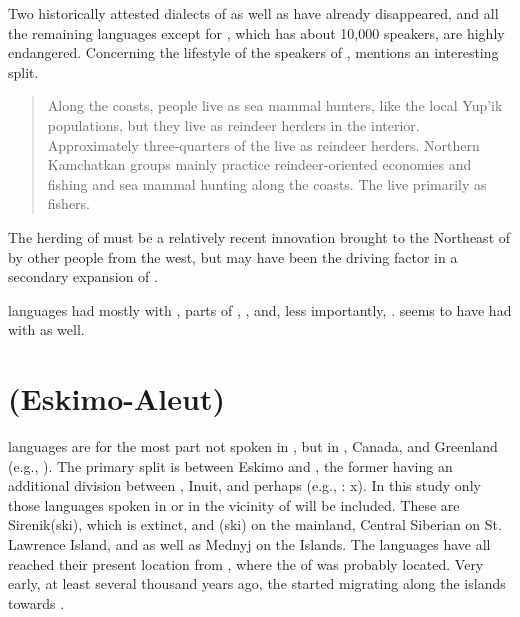 Two historically attested dialects of  as well as  have already disappeared, and all the remaining languages except for , which has about 10,000 speakers, are highly endangered. Concerning the lifestyle of the speakers of , \citet[416]{Anderson2006c} mentions an interesting split.

\begin{quote}
Along the coasts,  people live as sea mammal hunters, like the local Yup’ik populations, but they live as reindeer herders in the interior. Approximately three-quarters of the  live as reindeer herders. Northern Kamchatkan groups mainly practice reindeer-oriented economies and fishing and sea mammal hunting along the coasts. The  live primarily as  fishers.
\end{quote}

\noindent The herding of  must be a relatively recent innovation brought to the Northeast of  by other people from the west, but may have been the driving factor in a secondary expansion of .

 languages had  mostly with , parts of , ,  and, less importantly, .  seems to have had  with  as well.

\section{ (Eskimo-Aleut)}\label{sec:2.4}

 languages are for the most part not spoken in , but in , Canada, and Greenland (e.g., \citealt{Berge2006}). The primary split is between Eskimo and , the former having an additional division between , Inuit, and perhaps  (e.g., \citealt{FortescueJacobsonKaplan2010}: x). In this study only those  languages spoken in or in the vicinity of  will be included. These are Sirenik(ski), which is extinct, and (ski)  on the mainland, Central Siberian  on St. Lawrence Island, and  as well as Mednyj  on the  Islands. The languages have all reached their present location from , where the  of  was probably located. Very early, at least several thousand years ago, the  started migrating along the  islands towards .

